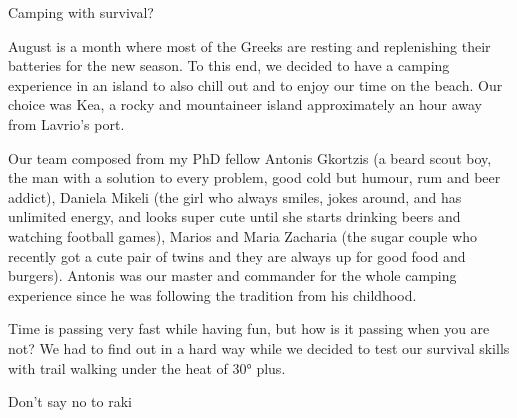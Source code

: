 \documentclass[10pt,a4paper]{article} %
\newcommand{\NewsItem}[1]{ %
\usefont{T1}{fvs}{n}{n} %
\vspace{24pt}\large #1\vspace{3pt} %
\par \normalsize \normalfont}
\begin{document}
\begin{multicols}{3}
\NewsItem{Camping with survival?}

August is a month where most of the Greeks are resting and replenishing their 
batteries for the new season. 
To this end, we decided to have a camping experience in an island to also chill 
out and to enjoy our time on the beach. 
Our choice was Kea, a rocky and mountaineer island approximately an hour away 
from Lavrio's port.


Our team composed from my PhD fellow Antonis Gkortzis (a beard scout boy, 
the man with a solution to every problem, good cold but humour, rum and beer addict), 
Daniela Mikeli (the girl who always smiles, jokes around, and has unlimited energy, 
and looks super cute until she starts drinking beers and watching football games), 
Marios and Maria Zacharia (the sugar couple who recently got a cute pair of twins 
and they are always up for good food and burgers).  
Antonis was our master and commander for the whole camping experience since he was 
following the tradition from his childhood. 





Time is passing very fast while having fun, but how is it passing when you are not? 
We had to find out in a hard way while we decided to test our survival skills 
with trail walking under the heat of \ang{30} plus.  


\NewsItem{Don't say no to raki}







\end{multicols}

\end{document}
